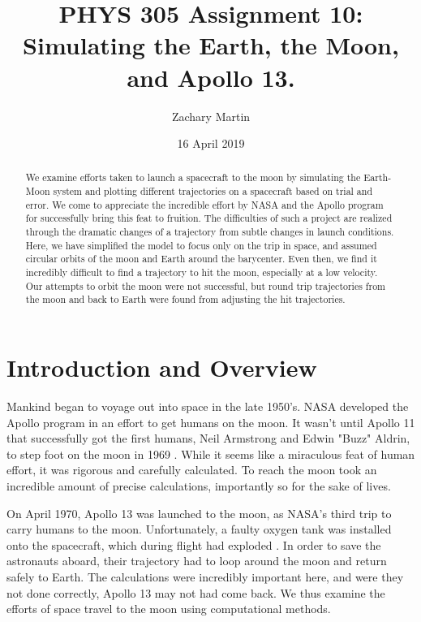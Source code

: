 \documentclass[aps,prl,twocolumn,superscriptaddress]{revtex4-1}
\begin{document}
\title{PHYS 305 Assignment 10: Simulating the Earth, the Moon, and Apollo 13.}
\author{Zachary Martin}
\date{16 April 2019}

\begin{abstract}
We examine efforts taken to launch a spacecraft to the moon by simulating the Earth-Moon system and plotting different trajectories on a spacecraft based on trial and error. We come to appreciate the incredible effort by NASA and the Apollo program for successfully bring this feat to fruition. The difficulties of such a project are realized through the dramatic changes of a trajectory from subtle changes in launch conditions. Here, we have simplified the model to focus only on the trip in space, and assumed circular orbits of the moon and Earth around the barycenter. Even then, we find it incredibly difficult to find a trajectory to hit the moon, especially at a low velocity. Our attempts to orbit the moon were not successful, but round trip trajectories from the moon and back to Earth were found from adjusting the hit trajectories.
\end{abstract}

\maketitle

\section{Introduction and Overview}
Mankind began to voyage out into space in the late 1950's. NASA developed the Apollo program in an effort to get humans on the moon. It wasn't until Apollo 11 that successfully got the first humans, Neil Armstrong and Edwin "Buzz" Aldrin, to step foot on the moon in 1969 \cite{space}. While it seems like a miraculous feat of human effort, it was rigorous and carefully calculated. To reach the moon took an incredible amount of precise calculations, importantly so for the sake of lives. 

On April 1970, Apollo 13 was launched to the moon, as NASA's third trip to carry humans to the moon. Unfortunately, a faulty oxygen tank was installed onto the spacecraft, which during flight had exploded \cite{apollo}. In order to save the astronauts aboard, their trajectory had to loop around the moon and return safely to Earth. The calculations were incredibly important here, and were they not done correctly, Apollo 13 may not had come back. We thus examine the efforts of space travel to the moon using computational methods. 
\end{document}

